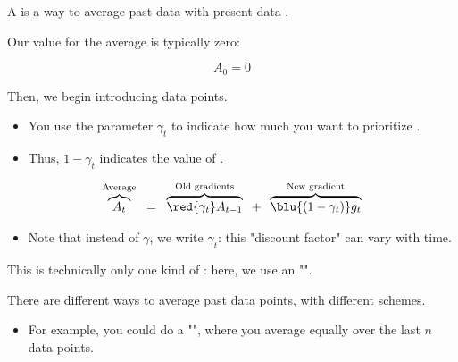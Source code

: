             \begin{definition}
                A  is a way to average past data with present data .

                Our  value for the average is typically zero:

                \begin{equation*}
                    A_0=0
                \end{equation*}

                Then, we begin introducing  data points.
                
                \begin{itemize}
                    \item You use the parameter $\gamma_t$ to indicate how much you want to prioritize .
                    \item Thus, $1-\gamma_t$ indicates the value of .
                \end{itemize}

                \begin{equation*}
                    \overbrace{
                        A_t 
                    }^{\text{Average}}
                    \;\;=\;\;
                    \overbrace{
                        \red{\gamma_t} A_{t-1}
                    }^{\text{Old gradients}}
                    \;\;+\;\; 
                    \overbrace{
                        \blu{(1-\gamma_t)} g_{t}
                    }^{\text{New gradient}}
                \end{equation*}

                \subsecdiv

                \begin{itemize}
                    \item Note that instead of $\gamma$, we write $\gamma_t$: this "discount factor" can vary with time.

                \end{itemize}

                
            \end{definition}

            \phantom{}

            \begin{clarification}
                This is technically only one kind of : here, we use an "". 

                There are different ways to average past data points, with different  schemes.
                    
                    \begin{itemize}
                        \item For example, you could do a "", where you average equally over the last $n$ data points.
                    \end{itemize}
            \end{clarification}

